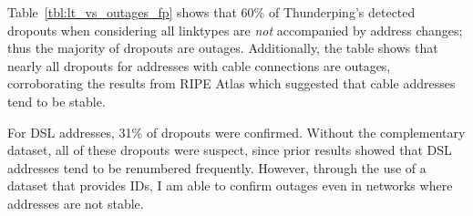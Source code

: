  Table~\ref{tbl:lt_vs_outages_fp} shows that 60\% of Thunderping's detected dropouts when considering all linktypes are \emph{not} accompanied by address changes; thus the majority of dropouts are outages. Additionally, the table shows that nearly all dropouts for addresses with cable connections are outages, corroborating the results from RIPE Atlas which suggested that cable addresses tend to be stable. 

For DSL addresses, 31\% of dropouts were confirmed. Without the complementary dataset, all of these dropouts were suspect, since prior results showed that DSL addresses tend to be renumbered frequently. However, through the use of a dataset that provides IDs, I am able to confirm outages even in networks where addresses are not stable.




